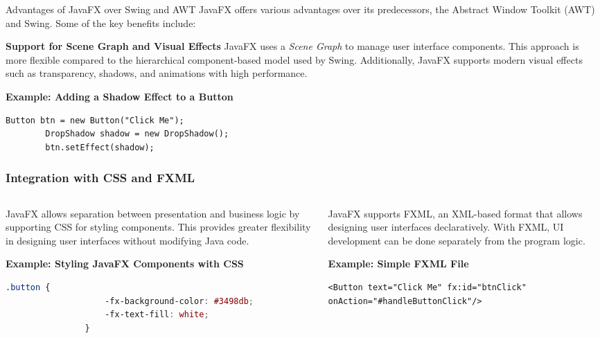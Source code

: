 \documentclass[aspectratio=169, table]{beamer}
\begin{document}
\begin{frame}[fragile]{Advantages of JavaFX over Swing and AWT}
	\vspace{20pt}
	JavaFX offers various advantages over its predecessors, the Abstract Window Toolkit (AWT) and Swing. Some of the key benefits include:
	
	\bigskip
	\textbf{Support for Scene Graph and Visual Effects}  
	JavaFX uses a \textit{Scene Graph} to manage user interface components.  
	This approach is more flexible compared to the hierarchical component-based model used by Swing.  
	Additionally, JavaFX supports modern visual effects such as transparency, shadows, and animations with high performance.
	
	\bigskip
	\textbf{Example: Adding a Shadow Effect to a Button}
	
	\begin{lstlisting}[style=JavaStyle]
		Button btn = new Button("Click Me");
		DropShadow shadow = new DropShadow();
		btn.setEffect(shadow);
	\end{lstlisting}
\end{frame}


\begin{frame}[fragile]
	\frametitle{Integration with CSS and FXML}
	\vspace{25pt}
	\begin{columns}[t]
		\begin{column}{0.5\textwidth}
			JavaFX allows separation between presentation and business logic by supporting CSS for styling components.  
			This provides greater flexibility in designing user interfaces without modifying Java code.
			
			\bigskip
			\textbf{Example: Styling JavaFX Components with CSS}
			
			\begin{lstlisting}[language=css]
				.button {
					-fx-background-color: #3498db;
					-fx-text-fill: white;
				}
			\end{lstlisting}
		\end{column}
		\begin{column}{0.5\textwidth}
			JavaFX supports FXML, an XML-based format that allows designing user interfaces declaratively.  
			With FXML, UI development can be done separately from the program logic.
			
			\bigskip
			\textbf{Example: Simple FXML File}
			
			\begin{lstlisting}[style=XmlStyle]
				<Button text="Click Me" fx:id="btnClick" onAction="#handleButtonClick"/>
			\end{lstlisting}
		\end{column}
	\end{columns}
\end{frame}
\end{document}
